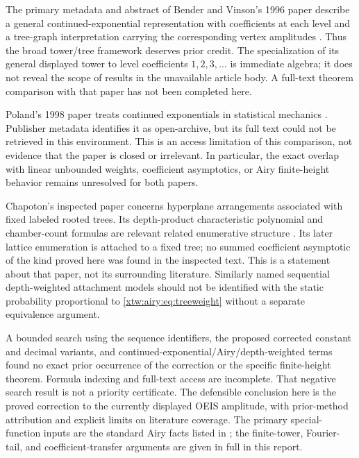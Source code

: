 \documentclass[11pt]{article}
\theoremstyle{remark}\newtheorem{remark}[theorem]{Remark}
\begin{document}
The primary metadata and abstract of Bender and Vinson's 1996 paper describe
a general continued-exponential representation with coefficients at each
level and a tree-graph interpretation carrying the corresponding vertex
amplitudes \cite{bv}. Thus the broad tower/tree framework deserves prior
credit. The specialization of its general displayed tower to level
coefficients $1,2,3,\ldots$ is immediate algebra; it does not reveal the scope
of results in the unavailable article body. A full-text theorem comparison
with that paper has not been completed here.

Poland's 1998 paper treats continued exponentials in statistical mechanics
\cite{poland}. Publisher metadata identifies it as open-archive, but its full
text could not be retrieved in this environment. This is an access limitation
of this comparison, not evidence that the paper is closed or irrelevant.
In particular, the exact overlap with linear unbounded weights, coefficient
asymptotics, or Airy finite-height behavior remains unresolved for both papers.

Chapoton's inspected paper concerns hyperplane arrangements associated with
fixed labeled rooted trees. Its depth-product characteristic polynomial and
chamber-count formulas are relevant related enumerative structure
\cite{chapoton}. Its later lattice enumeration is attached to a fixed tree;
no summed coefficient asymptotic of the kind proved here was found in the
inspected text. This is a statement about that paper, not its surrounding
literature. Similarly named sequential depth-weighted attachment models
should not be identified with the static probability proportional to
\eqref{xtw:airy:eq:treeweight} without a separate equivalence argument.

A bounded search using the sequence identifiers, the proposed corrected
constant and decimal variants, and continued-exponential/Airy/depth-weighted
terms found no exact prior occurrence of the correction or the specific
finite-height theorem. Formula indexing and full-text access are incomplete.
That negative search result is not a priority certificate. The defensible
conclusion here is the proved correction to the currently displayed OEIS
amplitude, with prior-method attribution and explicit limits on literature
coverage. The primary special-function inputs are the standard Airy facts
listed in \cite{dlmf2,dlmf7,dlmf9}; the finite-tower, Fourier-tail, and
coefficient-transfer arguments are given in full in this report.
\end{document}
